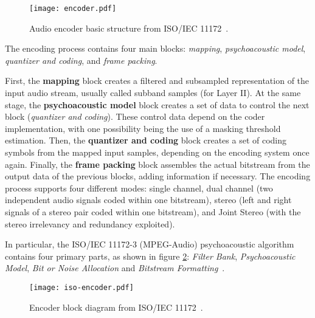 \begin{figure}[H]
\centerline{\texttt{[image: encoder.pdf]}}
\caption{Audio encoder basic structure from ISO/IEC 11172~\cite{11172}.}
\label{fig:encoder}
\end{figure}

The encoding process contains four main blocks: \textit{mapping}, \textit{psychoacoustic model}, \textit{quantizer and coding}, and \textit{frame packing}.

First, the \textbf{mapping} block creates a filtered and subsampled representation of the input audio stream, usually called subband samples (for Layer II). At the same stage, the \textbf{psychoacoustic model} block creates a set of data to control the next block (\textit{quantizer and coding}). These control data depend on the coder implementation, with one possibility being the use of a masking threshold estimation.
Then, the \textbf{quantizer and coding} block creates a set of coding symbols from the mapped input samples, depending on the encoding system once again. 
Finally, the \textbf{frame packing} block assembles the actual bitstream from the output data of the previous blocks, adding information if necessary.
The encoding process supports four different modes: single channel, dual channel (two independent audio signals coded within one bitstream), stereo (left and right signals of a stereo pair coded within one bitstream), and Joint Stereo (with the stereo irrelevancy and redundancy exploited).

In particular, the ISO/IEC 11172-3 (MPEG-Audio) psychoacoustic algorithm contains four primary parts, as shown in figure \ref{fig:algorithm}: \textit{Filter Bank}, \textit{Psychoacoustic Model}, \textit{Bit or Noise Allocation} and \textit{Bitstream Formatting}~\cite{11172}.

\begin{figure}[H]
\centerline{\texttt{[image: iso-encoder.pdf]}}
\caption{Encoder block diagram from ISO/IEC 11172~\cite{11172}.}
\label{fig:algorithm}
\end{figure}


